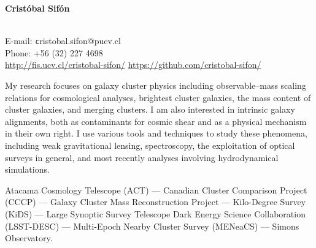 \documentclass[11pt]{article}
\begin{document}
\begin{minipage}[b]{0.46\linewidth}
\flushleft
\hspace{-0.7cm}
{\bf\huge Crist\'obal Sif\'on}\\\vspace{0.2cm}
\\
\end{minipage}
\begin{minipage}[b]{0.49\linewidth}
\flushright
{\large E-mail: {\texttt cristobal.sifon@pucv.cl}\\
        Phone: +56 (32) 227 4698\\
        \url{http://fis.ucv.cl/cristobal-sifon/}
        \url{https://github.com/cristobal-sifon/}}
\end{minipage}
\vspace{0.4cm}
\hline




My research focuses on galaxy cluster physics including observable--mass scaling relations for cosmological analyses, brightest cluster galaxies, the mass content of cluster galaxies, and merging clusters. I am also interested in intrinsic galaxy alignments, both as contaminants for cosmic shear and as a physical mechanism in their own right. I use various tools and techniques to study these phenomena, including weak gravitational lensing, spectroscopy, the exploitation of optical surveys in general, and most recently analyses involving hydrodynamical simulations.

\vspace{0.5cm}
{
 Atacama Cosmology Telescope (ACT) ---
 Canadian Cluster Comparison Project (CCCP) ---
 Galaxy Cluster Mass Reconstruction Project ---
 Kilo-Degree Survey (KiDS) ---
 Large Synoptic Survey Telescope Dark Energy Science Collaboration (LSST-DESC) ---
 Multi-Epoch Nearby Cluster Survey (MENeaCS) ---
 Simons Observatory.
}
\end{document}
